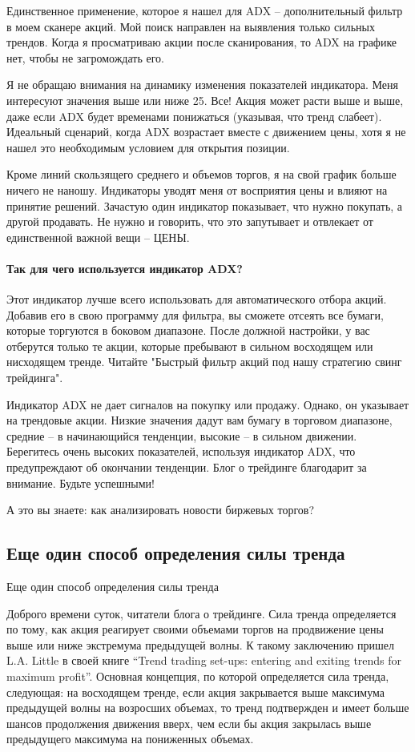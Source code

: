 \documentclass[a5paper]{article}
\begin{document}
Единственное применение, которое я нашел для ADX – дополнительный фильтр в моем сканере акций. Мой поиск направлен на выявления только сильных трендов. Когда я просматриваю акции после сканирования, то ADX на графике нет, чтобы не загромождать его.

Я не обращаю внимания на динамику изменения показателей индикатора. Меня интересуют значения выше или ниже 25. Все! Акция может расти выше и выше, даже если ADX будет временами понижаться (указывая, что тренд слабеет). Идеальный сценарий, когда ADX возрастает вместе с движением цены, хотя я не нашел это необходимым условием для открытия позиции.

Кроме линий скользящего среднего и объемов торгов, я на свой график
больше ничего не наношу. Индикаторы уводят меня от восприятия цены и
влияют на принятие решений. Зачастую один индикатор показывает, что
нужно покупать, а другой продавать. Не нужно и говорить, что это
запутывает и отвлекает от единственной важной вещи – ЦЕНЫ.

\paragraph{Так для чего используется индикатор ADX?}

Этот индикатор лучше всего использовать для автоматического отбора акций. Добавив его в свою программу для фильтра, вы сможете отсеять все бумаги, которые торгуются в боковом диапазоне. После должной настройки, у вас отберутся только те акции, которые пребывают в сильном восходящем или нисходящем тренде. Читайте "Быстрый фильтр акций под нашу стратегию свинг трейдинга".

Индикатор ADX не дает сигналов на покупку или продажу. Однако, он указывает на трендовые акции. Низкие значения дадут вам бумагу в торговом диапазоне, средние – в начинающийся тенденции, высокие – в сильном движении. Берегитесь очень высоких показателей, используя индикатор ADX, что предупреждают об окончании тенденции. Блог о трейдинге благодарит за внимание. Будьте успешными!


А это вы знаете: как анализировать новости биржевых торгов?

\subsection{Еще один способ определения силы тренда}

Еще один способ определения силы тренда

Доброго времени суток, читатели блога о трейдинге. Сила тренда определяется по тому, как акция реагирует своими объемами торгов на продвижение цены выше или ниже экстремума предыдущей волны. К такому заключению пришел L.A. Little в своей книге “Trend trading set-ups: entering and exiting trends for maximum profit”. Основная концепция, по которой определяется сила тренда, следующая: на восходящем тренде, если акция закрывается выше максимума предыдущей волны на возросших объемах, то тренд подтвержден и имеет больше шансов продолжения движения вверх, чем если бы акция закрылась выше предыдущего максимума на пониженных объемах.
\end{document}
